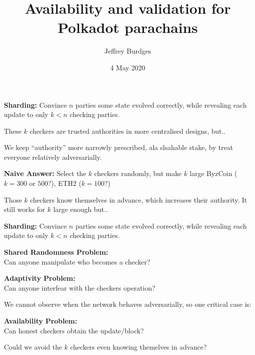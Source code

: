 \documentclass{beamer}
\title[A\&V]{Availability and validation for Polkadot parachains}
\author[Burdges]{Jeffrey Burdges}
\institute[W3F]{
 Web 3 Foundation
}
\date{\small 4 May 2020}
\begin{document}
\begin{frame}
\titlepage
\end{frame}


\begin{frame}[t]

{\bf Sharding:}  Convince $n$ parties some state evolved correctly, while revealing each update to only $k<n$ checking parties.

\bigskip\bigskip
These $k$ checkers are trusted authorities in more centralised designs, but..

\medskip

We keep ``authority'' more narrowly prescribed, ala slsahable stake,
by treat everyone relatively adversarially. 

\pause
\bigskip\bigskip

{\bf Naive Answer:}   
Select the $k$ checkers randomly, but make $k$ large
\hspace*{3pt} ByzCoin ($k=300$ or $500$?), ETH2 ($k=100$?)

\medskip

Those $k$ checkers know themselves in advance, which increases their authority.
It still works for $k$ large enough but..

\end{frame}


\begin{frame}[t]

{\bf Sharding:}  Convince $n$ parties some state evolved correctly, while revealing each update to only $k<n$ checking parties.

\bigskip\bigskip

{\bf Shared Randomness Problem:}  \\
Can anyone manipulate who becomes a checker?

\bigskip\bigskip

{\bf Adaptivity Problem:}  \\
Can anyone interfear with the checkers operation?

\bigskip
We cannot observe when the network behaves adversarially, so one critical case is:

{\bf Availability Problem:}  \\
Can honest checkers obtain the update/block?  

\pause
\bigskip\bigskip

Could we avoid the $k$ checkers even knowing themelves in advance? 

\end{frame}
\end{document}
